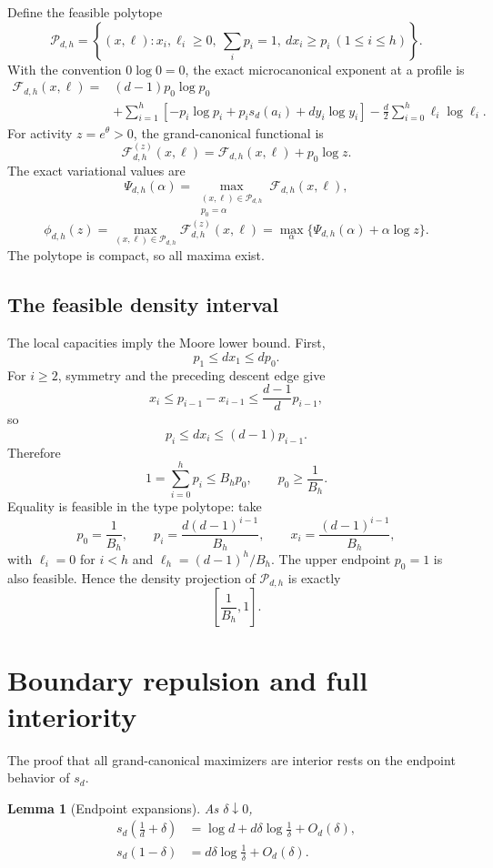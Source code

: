 \documentclass[11pt]{amsart}
\newtheorem{lemma}[theorem]{Lemma}
\theoremstyle{definition}
\newcommand{\Fcal}{\mathcal F}
\newcommand{\Pcal}{\mathcal P}
\begin{document}
Define the feasible polytope
\[
 \Pcal_{d,h}
 =\left\{(x,\ell):
 x_i,\ell_i\ge0,
 \ \sum_i p_i=1,
 \ d x_i\ge p_i\ (1\le i\le h)
 \right\}.
\]
With the convention $0\log0=0$, the exact microcanonical exponent at a profile is
\begin{equation}\label{eq:compact}
\begin{aligned}
 \Fcal_{d,h}(x,\ell)
 ={}&(d-1)p_0\log p_0\\
 &+\sum_{i=1}^h
 \left[
 -p_i\log p_i+p_i s_d(a_i)+d y_i\log y_i
 \right]
 -\frac d2\sum_{i=0}^h\ell_i\log\ell_i.
\end{aligned}
\end{equation}
For activity $z=e^\theta>0$, the grand-canonical functional is
\begin{equation}\label{eq:grand-functional}
 \Fcal_{d,h}^{(z)}(x,\ell)
 =\Fcal_{d,h}(x,\ell)+p_0\log z.
\end{equation}
The exact variational values are
\[
 \Psi_{d,h}(\alpha)
 =\max_{\substack{(x,\ell)\in\Pcal_{d,h}\\p_0=\alpha}}
 \Fcal_{d,h}(x,\ell),
\]
\[
 \phi_{d,h}(z)
 =\max_{(x,\ell)\in\Pcal_{d,h}}
 \Fcal_{d,h}^{(z)}(x,\ell)
 =\max_\alpha\{\Psi_{d,h}(\alpha)+\alpha\log z\}.
\]
The polytope is compact, so all maxima exist.

\subsection{The feasible density interval}
The local capacities imply the Moore lower bound.  First,
\[
 p_1\le d x_1\le d p_0.
\]
For $i\ge2$, symmetry and the preceding descent edge give
\[
 x_i\le p_{i-1}-x_{i-1}
 \le\frac{d-1}{d}p_{i-1},
\]
so
\[
 p_i\le d x_i\le(d-1)p_{i-1}.
\]
Therefore
\[
 1=\sum_{i=0}^h p_i\le B_h p_0,
 \qquad p_0\ge\frac1{B_h}.
\]
Equality is feasible in the type polytope: take
\[
 p_0=\frac1{B_h},
 \qquad
 p_i=\frac{d(d-1)^{i-1}}{B_h},
 \qquad
 x_i=\frac{(d-1)^{i-1}}{B_h},
\]
with $\ell_i=0$ for $i<h$ and $\ell_h=(d-1)^h/B_h$.  The upper endpoint $p_0=1$ is also feasible.  Hence the density projection of $\Pcal_{d,h}$ is exactly
\[
 \left[\frac1{B_h},1\right].
\]


\section{Boundary repulsion and full interiority}
The proof that all grand-canonical maximizers are interior rests on the endpoint behavior of $s_d$.

\begin{lemma}[Endpoint expansions]\label{lem:sd-endpoints}
As $\delta\downarrow0$,
\begin{align}
 s_d\left(\frac1d+\delta\right)
 &=\log d+d\delta\log\frac1\delta+O_d(\delta),
 \label{eq:sd-lower}\\
 s_d(1-\delta)
 &=d\delta\log\frac1\delta+O_d(\delta).
 \label{eq:sd-upper}
\end{align}
\end{lemma}
\end{document}
